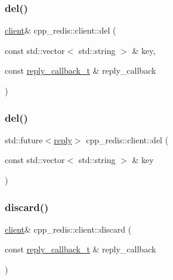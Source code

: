 \mbox{\label{classcpp__redis_1_1client_a29a5307b20d9ffe951e2ff302797a296}} 
\subsubsection{\texorpdfstring{del()}{del()}\hspace{0.1cm}{\footnotesize\ttfamily [1/2]}}
{\footnotesize\ttfamily \hyperlink{classcpp__redis_1_1client}{client}\& cpp\+\_\+redis\+::client\+::del (\begin{DoxyParamCaption}\item[{const std\+::vector$<$ std\+::string $>$ \&}]{key,  }\item[{const \hyperlink{classcpp__redis_1_1client_a061a1140d36d2eaeda82b09a0bb3f9f2}{reply\+\_\+callback\+\_\+t} \&}]{reply\+\_\+callback }\end{DoxyParamCaption})}

\mbox{\label{classcpp__redis_1_1client_a99c090de7e23accfaf3b93f4b025d2e9}} 
\subsubsection{\texorpdfstring{del()}{del()}\hspace{0.1cm}{\footnotesize\ttfamily [2/2]}}
{\footnotesize\ttfamily std\+::future$<$\hyperlink{classcpp__redis_1_1reply}{reply}$>$ cpp\+\_\+redis\+::client\+::del (\begin{DoxyParamCaption}\item[{const std\+::vector$<$ std\+::string $>$ \&}]{key }\end{DoxyParamCaption})}

\mbox{\label{classcpp__redis_1_1client_a0f5a07744750f87504f72dcf66144a24}} 
\subsubsection{\texorpdfstring{discard()}{discard()}\hspace{0.1cm}{\footnotesize\ttfamily [1/2]}}
{\footnotesize\ttfamily \hyperlink{classcpp__redis_1_1client}{client}\& cpp\+\_\+redis\+::client\+::discard (\begin{DoxyParamCaption}\item[{const \hyperlink{classcpp__redis_1_1client_a061a1140d36d2eaeda82b09a0bb3f9f2}{reply\+\_\+callback\+\_\+t} \&}]{reply\+\_\+callback }\end{DoxyParamCaption})}

